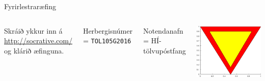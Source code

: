 \documentclass[handout]{beamer}
\begin{document}
\begin{frame}{Fyrirlestraræfing}
\begin{columns}
Skráið ykkur inn á \url{http://socrative.com/} og klárið æfinguna.

Herbergisnúmer = \texttt{TOL105G2016}

Notendanafn = HÍ-tölvupóstfang
\begin{center}
\includegraphics[width=0.8\linewidth]{Pics/bidskylda}
\end{center}
\end{columns}
\end{frame}
\end{document}
